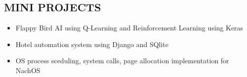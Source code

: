 \documentclass[letterpaper]{twentysecondcv} %
\begin{document}
\subsection{MINI PROJECTS}
\begin{itemize}
\item Flappy Bird AI using Q-Learning and Reinforcement Learning using Keras %
\item Hotel automation system using Django and SQlite
\item OS process sceduling, system calls, page allocation implementation for NachOS
\end{itemize}











\end{document}
